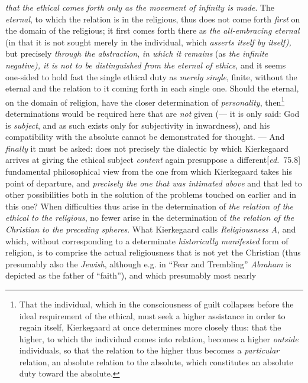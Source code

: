 \documentclass[12pt,a4paper,openany]{book}
\newcommand{\kpage}[1]{\marginnote{\footnotesize\textit{[#1]}}}
\newcommand{\ed}[1]{{\small[\textit{ed.}\ #1]}}
\begin{document}
\emph{that the ethical comes forth only as the movement of infinity is made}. The
\emph{eternal}, to which the relation is in the religious, thus does not come forth \emph{first}
on the domain of the religious; it first comes forth there as \emph{the
all-embracing eternal} (in that it is not sought merely in the individual, which \emph{asserts
itself by itself),} but precisely \emph{through the abstraction}, \emph{in which it remains} (as \emph{the
infinite negative), it is not to be distinguished from the eternal of ethics}, and it seems
one-sided to hold fast the single ethical duty as \emph{merely single}, finite,
without the eternal and the relation to it coming forth in each single
one. Should the eternal, on the domain of religion, have the closer
\kpage{173}determination of \emph{personality}, then\footnote[130]{That the individual, which in the consciousness of guilt collapses before the ideal requirement of the ethical, must seek a higher assistance in order to regain itself, Kierkegaard at once determines more closely thus: that the higher, to which the individual comes into relation, becomes a higher \emph{outside} individuals, so that the relation to the higher thus becomes a \emph{particular} relation, an absolute relation to the absolute, which constitutes an absolute duty toward the absolute.} determinations would be required here
that are \emph{not} given (--- it is only said: God is \emph{subject}, and as such exists
only for subjectivity in inwardness), and his compatibility
with the absolute cannot be demonstrated for thought. --- And \emph{finally} it must
be asked: does not precisely the dialectic by which
Kierkegaard arrives at giving the ethical subject \emph{content} again presuppose a
different\ed{75.8} fundamental philosophical view from the one from which
Kierkegaard takes his point of departure, and \emph{precisely the one that was
intimated above} and that led to other possibilities both in the solution of the
problems touched on earlier and in this one? When difficulties thus arise
in the determination of \emph{the relation of the ethical to the religious},
no fewer arise in the determination of \emph{the relation of the Christian
to the preceding spheres}. What Kierkegaard calls \emph{Religiousness
A}, and which, without corresponding to a determinate \emph{historically manifested} form of
religion, is to comprise the actual religiousness that is not yet
the Christian (thus presumably also the \emph{Jewish}, although e.g. in ``Fear
and Trembling'' \emph{Abraham} is depicted as the father of ``faith''), and which presumably most nearly
\end{document}
